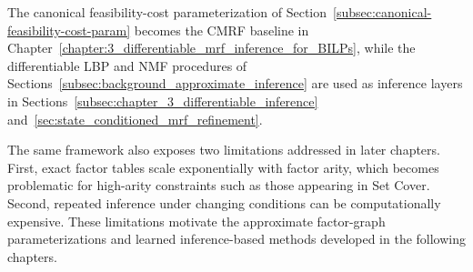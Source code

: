 The canonical feasibility-cost parameterization of Section~\ref{subsec:canonical-feasibility-cost-param} becomes the CMRF baseline in Chapter~\ref{chapter:3_differentiable_mrf_inference_for_BILPs}, while the differentiable LBP and NMF procedures of Sections~\ref{subsec:background_approximate_inference} are used as inference layers in Sections~\ref{subsec:chapter_3_differentiable_inference} and~\ref{sec:state_conditioned_mrf_refinement}.

The same framework also exposes two limitations addressed in later chapters. First, exact factor tables scale exponentially with factor arity, which becomes problematic for high-arity constraints such as those appearing in Set Cover. Second, repeated inference under changing conditions can be computationally expensive. These limitations motivate the approximate factor-graph parameterizations and learned inference-based methods developed in the following chapters.

